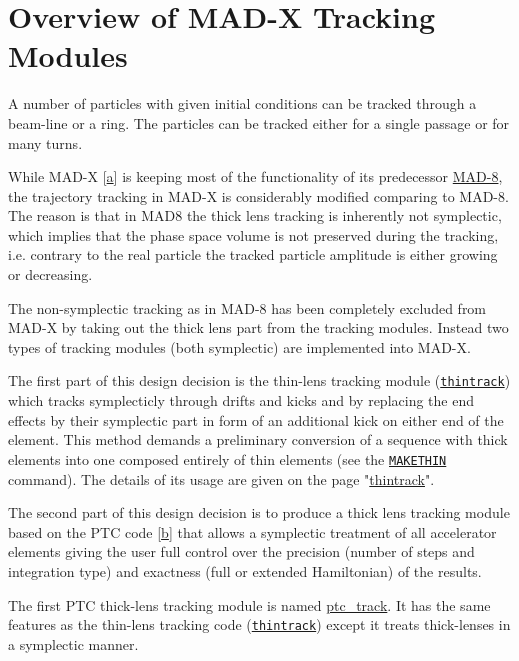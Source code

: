 
\chapter{Overview of MAD-X Tracking Modules}

A number of particles with given initial conditions can be tracked
through a beam-line or a ring. The particles can be tracked either for a
single passage or for many turns.  


While MAD-X [\hyperlink{F._Schmidt}{a}] is keeping most of the
functionality of  its predecessor \href{http://cern.ch/mad8}{MAD-8}, the
trajectory tracking in MAD-X is considerably modified comparing to
MAD-8. 
The reason is that in MAD8 the thick lens tracking is inherently not
symplectic, which implies that the phase space volume is not preserved
during the tracking, i.e. contrary to the real particle the tracked
particle amplitude is either growing or decreasing. 


The non-symplectic tracking as in MAD-8 has been completely excluded
from MAD-X by taking out the thick lens part from the tracking
modules. Instead two types of tracking modules (both symplectic) are
implemented into MAD-X. 


The first part of this design decision is the thin-lens tracking module
(\texttt{\href{../thintrack/thintrack.html}{thintrack}})  which tracks
symplecticly through drifts and kicks and by replacing the end effects
by their symplectic part in form of an additional kick on either  end of
the element. This method demands a preliminary conversion of a sequence
with thick elements into one composed entirely of thin elements (see the
\texttt{\href{../makethin/makethin.html}{MAKETHIN}} command). The
details of its usage are given on the page
"\href{../thintrack/thintrack.html}{thintrack}". 


The second part of this design decision is to produce a thick lens
tracking module based on the PTC code [\hyperlink{E._Forest}{b}] that
allows a symplectic treatment of all accelerator elements giving the
user full control over the precision (number of steps and integration
type) and exactness (full or extended Hamiltonian) of the results. 


The first PTC thick-lens tracking module is named
\href{../ptc_track/ptc_track.html}{ptc\_track}. It has the same features
as the thin-lens tracking code
(\texttt{\href{../thintrack/thintrack.html}{thintrack}}) except it
treats thick-lenses in a symplectic manner. 


